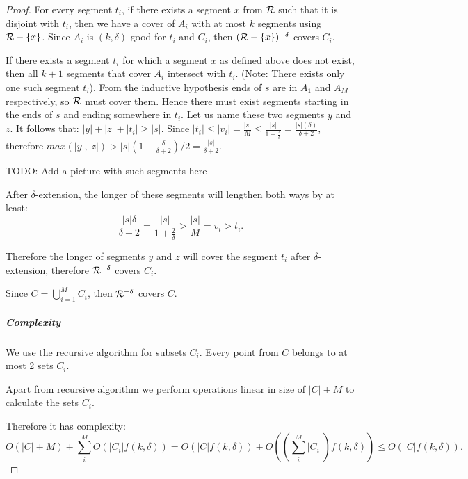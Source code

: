 \begin{proof}
For every segment $t_i$, if there exists a segment $x$ from $\mathcal{R}$ 
such that it is disjoint with $t_i$,
then we have a cover of $A_i$ with at most $k$
segments using $\mathcal{R} - \{x\}$.
Since $A_i$ is $(k, \delta)$-good for $t_i$ and $C_i$,
then $(\mathcal{R} - \{x\})^{+\delta}$ covers $C_i$.

If there exists a segment $t_i$ for which a segment $x$ as defined above
does not exist, then all $k+1$ segments that cover
$A_i$ intersect with $t_i$. (Note: There exists only one such segment $t_i$).
From the inductive hypothesis ends of $s$ are
in $A_1$ and $A_M$ respectively, so $\mathcal{R}$ must cover them.
Hence there must exist
segments starting in the ends of $s$ and ending somewhere in $t_i$.
Let us name these two segments $y$ and $z$. It follows that:
$|y| + |z| + |t_i| \ge |s|$.
Since $|t_i| \le |v_i| = \frac{|s|}{M} \le \frac{|s|}{1+\frac{2}{\delta}} = \frac{|s|(\delta)}{\delta+2}$,
therefore $max(|y|, |z|) > |s|(1-\frac{\delta}{\delta+2})/2 = \frac{|s|}{\delta+2}$.

TODO: Add a picture with such segments here

After $\delta$-extension, the longer of these segments will
lengthen both ways by at least:
$$\frac{|s|\delta}{\delta+2} = \frac{|s|}{1+\frac{2}{\delta}} > \frac{|s|}{M} = v_i > t_i.$$

Therefore the longer of segments $y$ and $z$ will cover the segment $t_i$
after $\delta$-extension, therefore $\mathcal{R}^{+\delta}$ covers $C_i$.

Since $C = \bigcup_{i=1}^M C_i$,
then $\mathcal{R}^{+\delta}$ covers $C$.

\subparagraph{Complexity}

We use the recursive algorithm for subsets $C_i$. Every point
from $C$ belongs to at most 2 sets $C_i$.

Apart from recursive algorithm we perform operations linear in
size of $|C| + M$ to calculate the sets $C_i$.

Therefore it has complexity:
$$O(|C|+M) + \sum_i^M O(|C_i|f(k, \delta)) = 
O(|C|f(k, \delta)) + O((\sum_i^M |C_i|)f(k, \delta)) \le O(|C|f(k, \delta)).$$

\end{proof}

